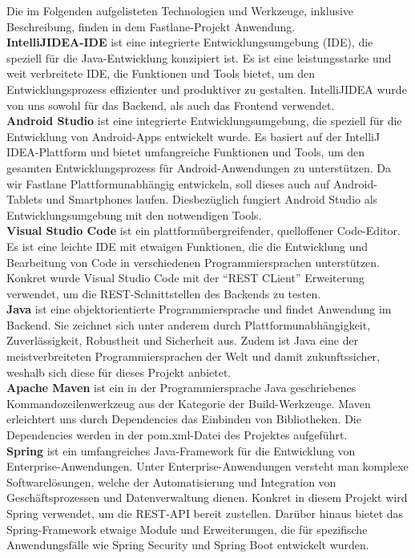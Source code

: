 Die im Folgenden aufgelisteten Technologien und Werkzeuge, inklusive Beschreibung, finden in dem Fastlane-Projekt Anwendung. \\

\textbf{IntelliJIDEA-IDE} ist eine integrierte Entwicklungsumgebung (IDE), die speziell für die Java-Entwicklung konzipiert ist.
Es ist eine leistungsstarke und weit verbreitete IDE, die Funktionen und Tools bietet, um den Entwicklungsprozess effizienter und produktiver zu gestalten.
IntelliJIDEA wurde von uns sowohl für das Backend, als auch das Frontend verwendet.\\

\textbf{Android Studio} ist eine integrierte Entwicklungsumgebung, die speziell für die Entwicklung von Android-Apps entwickelt wurde.
Es basiert auf der IntelliJ IDEA-Plattform und bietet umfangreiche Funktionen und Tools, um den gesamten Entwicklungsprozess für Android-Anwendungen zu unterstützen.
Da wir Fastlane Plattformunabhängig entwickeln, soll dieses auch auf Android-Tablets und Smartphones laufen.
Diesbezüglich fungiert Android Studio als Entwicklungsumgebung mit den notwendigen Tools.\\

\textbf{Visual Studio Code} ist ein plattformübergreifender, quelloffener Code-Editor.
Es ist eine leichte IDE mit etwaigen Funktionen, die die Entwicklung und Bearbeitung von Code in verschiedenen Programmiersprachen unterstützen.
Konkret wurde Visual Studio Code mit der \enquote{REST CLient} Erweiterung verwendet, um die REST-Schnittstellen des Backends zu testen.\\

\textbf{Java} ist eine objektorientierte Programmiersprache und findet Anwendung im Backend.
Sie zeichnet sich unter anderem durch Plattformunabhängigkeit, Zuverlässigkeit,
Robustheit und Sicherheit aus.
Zudem ist Java eine der meistverbreiteten Programmiersprachen der Welt und damit zukunftssicher, weshalb sich diese für dieses Projekt anbietet.\\

\textbf{Apache Maven} ist ein in der Programmiersprache Java geschriebenes Kommandozeilenwerkzeug aus der Kategorie
der Build-Werkzeuge.
Maven erleichtert uns durch Dependencies das Einbinden von Bibliotheken.
Die Dependencies werden in der pom.xml-Datei des Projektes aufgeführt.\\

\textbf{Spring} ist ein umfangreiches Java-Framework für die Entwicklung von Enterprise-Anwendungen.
Unter Enterprise-Anwendungen versteht man komplexe Softwarelösungen, welche der Automatisierung und Integration von Geschäftsprozessen und Datenverwaltung dienen.
Konkret in diesem Projekt wird Spring verwendet, um die REST-API bereit zustellen.
Darüber hinaus bietet das Spring-Framework etwaige Module und Erweiterungen, die für spezifische Anwendungsfälle wie Spring Security und Spring Boot entwickelt wurden.\\

